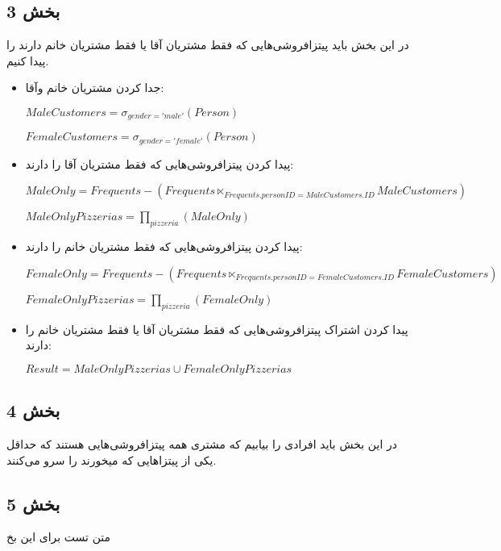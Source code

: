 \subsection*{بخش 3}
در این بخش باید پیتزافروشی‌هایی که فقط مشتریان آقا یا فقط مشتریان خانم دارند را پیدا کنیم.
\begin{itemize}	
	\item جدا کردن مشتریان خانم وآقا:
	
	\setLTR
	$MaleCustomers = \sigma_{gender = 'male'} (Person)$
	
	$FemaleCustomers = \sigma_{gender = 'female'} (Person)$
	\setRTL
	
	\item پیدا کردن پیتزافروشی‌هایی که فقط مشتریان آقا را دارند:
	
		\setLTR
$MaleOnly = Frequents - (Frequents \ltimes_{Frequents.personID=MaleCustomers.ID} MaleCustomers)$

$MaleOnlyPizzerias = \prod_{pizzeria} (MaleOnly)$
	\setRTL
	
		\item پیدا کردن پیتزافروشی‌هایی که فقط مشتریان خانم را دارند:
	
	\setLTR
	$FemaleOnly = Frequents - (Frequents \ltimes_{Frequents.personID=FemaleCustomers.ID} FemaleCustomers)$
	
	$FemaleOnlyPizzerias = \prod_{pizzeria} (FemaleOnly)$
	\setRTL
	
	\item پیدا کردن اشتراک پیتزافروشی‌هایی که فقط مشتریان آقا یا فقط مشتریان خانم را دارند:
	
		\setLTR
	$Result = MaleOnlyPizzerias \cup FemaleOnlyPizzerias$
	\setRTL
	
	
\end{itemize}

\subsection*{بخش 4}
در این بخش باید افرادی را بیابیم که مشتری همه پیتزافروشی‌هایی هستند که حداقل یکی از پیتزاهایی که
میخورند را سرو می‌کنند.


\subsection*{بخش 5}
متن تست برای این بخ
